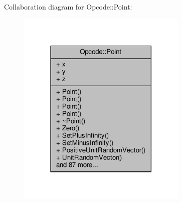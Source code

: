Collaboration diagram for Opcode\+:\+:Point\+:
\nopagebreak
\begin{figure}[H]
\begin{center}
\leavevmode
\includegraphics[width=230pt]{dd/d1f/classOpcode_1_1Point__coll__graph}
\end{center}
\end{figure}
